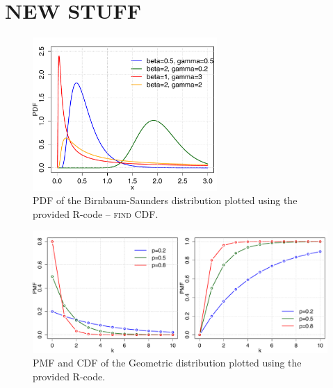 \section{NEW STUFF}

\begin{figure}[htb!]
\centering
  \includegraphics[width=70mm]{pics/BirnbaumSaunders_pdf.pdf}
 \caption{PDF of the Birnbaum-Saunders distribution plotted using the provided R-code -- {\color{red} \scshape{find CDF}}.}
 \label{fig:BirnbaumSaunders_pdf}
\end{figure}

\begin{figure}[htb!]
\centering
  \includegraphics[width=140mm]{pics/Geometric_pmf_cdf.pdf}
 \caption{PMF and CDF of the Geometric distribution plotted using the provided R-code.}
 \label{fig:Geometric_pmf_cdf}
\end{figure}

